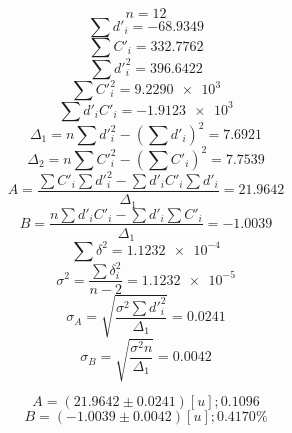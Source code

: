 \documentclass[letter,11pt]{article}
\begin{document}
\begin{equation*}
    n = 12
\end{equation*}
\begin{equation*}
    \sum d'_i = -68.9349
\end{equation*}
\begin{equation*}
    \sum C'_i = 332.7762
\end{equation*}
\begin{equation*}
    \sum d'^2_i = 396.6422
\end{equation*}
\begin{equation*}
    \sum C'^2_i = \num{9.2290e3}
\end{equation*}
\begin{equation*}
    \sum d'_i C'_i = \num{-1.9123e3}
\end{equation*}
\begin{equation*}
    \Delta_1 = n \sum d'^2_i - \left( \sum d'_i \right)^2 = 7.6921
\end{equation*}
\begin{equation*}
    \Delta_2 = n \sum C'^2_i - \left( \sum C'_i \right)^2 = 7.7539
\end{equation*}
\begin{equation*}
    A = \frac{\sum C'_i \sum d'^2_i - \sum d'_i C'_i \sum d'_i}{\Delta_1} = 21.9642
\end{equation*}
\begin{equation*}
    B = \frac{n \sum d'_i C'_i - \sum d'_i \sum C'_i}{\Delta_1} = -1.0039
\end{equation*}
\begin{equation*}
    \sum \delta^2 = \num{1.1232e-4}
\end{equation*}
\begin{equation*}
    \sigma^2 = \frac{\sum \delta^2_i}{n-2} = \num{1.1232e-5}
\end{equation*}
\begin{equation*}
    \sigma_A = \sqrt{\frac{\sigma^2 \sum d'^2_i}{\Delta_1}} = 0.0241
\end{equation*}
\begin{equation*}
    \sigma_B = \sqrt{\frac{\sigma^2 n}{\Delta_1}} = 0.0042
\end{equation*}

\begin{equation*}
    A = (21.9642 \pm 0.0241)[u]; 0.1096%
\end{equation*}
\begin{equation*}
    B = (-1.0039 \pm 0.0042)[u]; 0.4170\%
\end{equation*}
\end{document}
